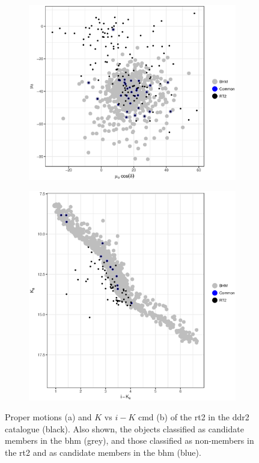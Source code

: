 \begin{figure}[ht!]
    \centering
    \begin{subfigure}[t]{0.45\textwidth}
    \centering
       \includegraphics[width=\textwidth]{background/Figures/RT2_pm.eps}
        \caption{}
    \end{subfigure}
    \begin{subfigure}[t]{0.45\textwidth}
    \centering
     \includegraphics[width=\textwidth]{background/Figures/RT2_ph.eps}
        \caption{}
    \end{subfigure}
\caption{Proper motions (a) and $K$ vs $i-K$ \gls{cmd} (b) of the \gls{rt2} in the \gls{ddr2} catalogue (black). Also shown, the objects classified as candidate members in the \gls{bhm} (grey), and those classified as non-members in the \gls{rt2} and as candidate members in the \gls{bhm} (blue).}
\label{fig:RT2}
\end{figure}
 
